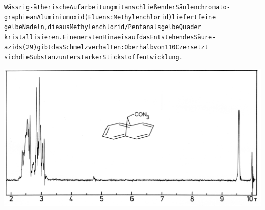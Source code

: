 \documentclass[a4paper,11pt]{article}
\begin{document}
\schemestop
\chemnameinit{}
\begin{alltt}

Wässrig-ätherische Aufarbeitung mit anschließender Säulenchromato-
graphie an Aluminiumoxid (Eluens: Methylenchlorid) liefert feine
gelbe Nadeln, die aus Methylenchlorid/Pentan als gelbe Quader
kristallisieren. Einen ersten Hinweis auf das Entstehen des Säure-
azids (29) gibt das Schmelzverhalten: Oberhalb von 110\degree{}C zersetzt
sich die Substanz unter starker Stickstoffentwicklung.

\end{alltt}
\hspace*{-0.25cm}\includegraphics[width=14.385cm]{NMR_003}
\end{document}
